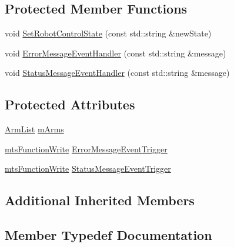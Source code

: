 \subsection*{Protected Member Functions}
\begin{DoxyCompactItemize}
\item 
void \hyperlink{classmts_intuitive_research_kit_console_a4d5d15ae77cdbb43066355d5a47fe0f7}{Set\+Robot\+Control\+State} (const std\+::string \&new\+State)
\item 
void \hyperlink{classmts_intuitive_research_kit_console_aad9cc3bbef2cc78d521c4e121b89cab7}{Error\+Message\+Event\+Handler} (const std\+::string \&message)
\item 
void \hyperlink{classmts_intuitive_research_kit_console_aa82918dfe2041afb8b66545df2c6b3e0}{Status\+Message\+Event\+Handler} (const std\+::string \&message)
\end{DoxyCompactItemize}
\subsection*{Protected Attributes}
\begin{DoxyCompactItemize}
\item 
\hyperlink{classmts_intuitive_research_kit_console_af9f8efcf17fe738d0143b3ea418198dd}{Arm\+List} \hyperlink{classmts_intuitive_research_kit_console_abe94e9e6282e5d7f50aa033aa04bc015}{m\+Arms}
\item 
\hyperlink{classmts_function_write}{mts\+Function\+Write} \hyperlink{classmts_intuitive_research_kit_console_aa9fe5ce6eead7feb87d4f5770e4f7a05}{Error\+Message\+Event\+Trigger}
\item 
\hyperlink{classmts_function_write}{mts\+Function\+Write} \hyperlink{classmts_intuitive_research_kit_console_ab15f69349bf2c5bc8fecd2fcb4de2107}{Status\+Message\+Event\+Trigger}
\end{DoxyCompactItemize}
\subsection*{Additional Inherited Members}


\subsection{Member Typedef Documentation}
\hypertarget{classmts_intuitive_research_kit_console_af9f8efcf17fe738d0143b3ea418198dd}{}
